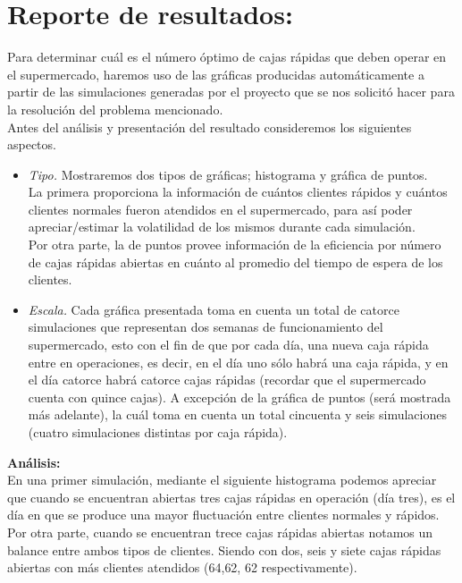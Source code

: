 \documentclass[letterpaper,11pt]{article}
\begin{document}
\section*{Reporte de resultados:}
Para determinar cuál es el número óptimo de cajas rápidas que deben operar en el supermercado, haremos uso de las gráficas producidas automáticamente a partir de las simulaciones generadas por el proyecto que se nos solicitó hacer para la resolución del problema mencionado.\\
Antes del análisis y presentación del resultado consideremos los siguientes aspectos.
\begin{itemize}
	\item \textit{Tipo.} Mostraremos dos tipos de gráficas; histograma y gráfica de puntos.\\
	La primera proporciona la información de cuántos clientes rápidos y cuántos clientes normales fueron atendidos en el supermercado, para así poder apreciar/estimar la volatilidad de los mismos durante cada simulación.\\
	Por otra parte, la de puntos provee información de la eficiencia por número de cajas rápidas abiertas en cuánto al promedio del tiempo de espera de los clientes.
\end{itemize}
\begin{itemize}
	\item \textit{Escala.} Cada gráfica presentada toma en cuenta un total de catorce simulaciones que representan dos semanas de funcionamiento del supermercado, esto con el fin de que por cada día, una nueva caja rápida entre en operaciones, es decir, en el día uno sólo habrá una caja rápida, y en el día catorce habrá catorce cajas rápidas (recordar que el supermercado cuenta con quince cajas). A excepción de la gráfica de puntos (será mostrada más adelante), la cuál toma en cuenta un total cincuenta y seis simulaciones (cuatro simulaciones distintas por caja rápida).
\end{itemize}
\textbf{Análisis:}\\
En una primer simulación, mediante el siguiente histograma podemos apreciar que cuando se encuentran abiertas tres cajas rápidas en operación (día tres), es el día en que se produce una mayor fluctuación entre clientes normales y rápidos.\\ Por otra parte, cuando se encuentran trece cajas rápidas abiertas notamos un balance entre ambos tipos de clientes. Siendo con dos, seis y siete cajas rápidas abiertas con más clientes atendidos (64,62, 62 respectivamente).
\end{document}
